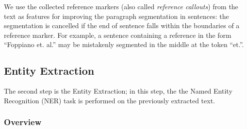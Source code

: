 \documentclass[]{interact}
\theoremstyle{plain}%
\theoremstyle{definition}
\theoremstyle{remark}
\begin{document}
We use the collected reference markers (also called \textit{reference callouts}) from the text as features for improving the paragraph segmentation in sentences: the segmentation is cancelled if the end of sentence falls within the boundaries of a reference marker.
For example, a sentence containing a reference in the form ``Foppiano et. al.'' may be mistakenly segmented in the middle at the token ``et.''.



\subsection{Entity Extraction}
\label{subsubsec:extraction}

The second step is the Entity Extraction; in this step, the the Named Entity Recognition (NER) task is performed on  the previously extracted text.

\subsubsection*{Overview}
\end{document}
